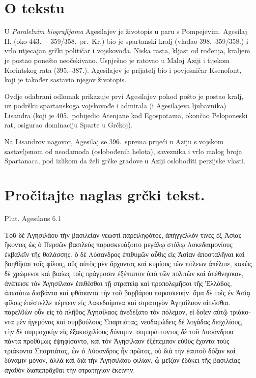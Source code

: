 


\section*{O tekstu}

U \textit{Paralelnim biografijama} Agesilajev je životopis u paru s Pompejevim. Agesilaj II. (oko 443.\ – 359/358.\ pr.~Kr.) bio je spartanski kralj (vladao 398.–359/358.) i vrlo utjecajan grčki političar i vojskovođa. Niska rasta, kljast od rođenja, kraljem je postao ponešto neočekivano. Uspješno je ratovao u Maloj Aziji i tijekom Korintskog rata (395.–387.). Agesilajev je prijatelj bio i povjesničar Ksenofont, koji je također sastavio njegov životopis. 

Ovdje odabrani odlomak prikazuje prvi Agesilajev pohod pošto je postao kralj, uz podršku spartanskoga vojskovođe i admirala (i Agesilajeva ljubavnika) Lisandra (koji je 405.\ pobijedio Atenjane kod Egospotama, okončao Peloponeski rat, osigurao dominaciju Sparte u Grčkoj).

Na Lisandrov nagovor, Agesilaj se 396.\ sprema prijeći u Aziju s vojskom sastavljenom od neodamoda (oslobođenih helota), saveznika i vrlo malog broja Spartanaca, pod izlikom da želi grčke gradove u Aziji osloboditi perzijske vlasti.


\section*{Pročitajte naglas grčki tekst.}
Plut. Agesilaus 6.1

\medskip

{\large
\begin{greek}
\noindent Τοῦ δὲ Ἀγησιλάου τὴν βασιλείαν νεωστὶ παρειληφότος, ἀπήγγελλόν τινες ἐξ Ἀσίας ἥκοντες ὡς ὁ Περσῶν βασιλεὺς παρασκευάζοιτο μεγάλῳ στόλῳ Λακεδαιμονίους ἐκβαλεῖν τῆς θαλάσσης. ὁ δὲ Λύσανδρος ἐπιθυμῶν αὖθις εἰς Ἀσίαν ἀποσταλῆναι καὶ βοηθῆσαι τοῖς φίλοις, οὓς αὐτὸς μὲν ἄρχοντας καὶ κυρίους τῶν πόλεων ἀπέλιπε, κακῶς δὲ χρώμενοι καὶ βιαίως τοῖς πράγμασιν ἐξέπιπτον ὑπὸ τῶν πολιτῶν καὶ ἀπέθνησκον, ἀνέπεισε τὸν Ἀγησίλαον ἐπιθέσθαι τῇ στρατείᾳ καὶ προπολεμῆσαι τῆς Ἑλλάδος, ἀπωτάτω διαβάντα καὶ φθάσαντα τὴν τοῦ βαρβάρου παρασκευήν. ἅμα δὲ τοῖς ἐν Ἀσίᾳ φίλοις ἐπέστελλε πέμπειν εἰς Λακεδαίμονα καὶ στρατηγὸν Ἀγησίλαον αἰτεῖσθαι. παρελθὼν οὖν εἰς τὸ πλῆθος Ἀγησίλαος ἀνεδέξατο τὸν πόλεμον, εἰ δοῖεν αὐτῷ τριάκοντα μὲν ἡγεμόνας καὶ συμβούλους Σπαρτιάτας, νεοδαμώδεις δὲ λογάδας δισχιλίους, τὴν δὲ συμμαχικὴν εἰς ἑξακισχιλίους δύναμιν. συμπράττοντος δὲ τοῦ Λυσάνδρου πάντα προθύμως ἐψηφίσαντο, καὶ τὸν Ἀγησίλαον ἐξέπεμπον εὐθὺς ἔχοντα τοὺς τριάκοντα Σπαρτιάτας, ὧν ὁ Λύσανδρος ἦν πρῶτος, οὐ διὰ τὴν ἑαυτοῦ δόξαν καὶ δύναμιν μόνον, ἀλλὰ καὶ διὰ τὴν Ἀγησιλάου φιλίαν, ᾧ μεῖζον ἐδόκει τῆς βασιλείας ἀγαθὸν διαπεπρᾶχθαι τὴν στρατηγίαν ἐκείνην.

\end{greek}
}

